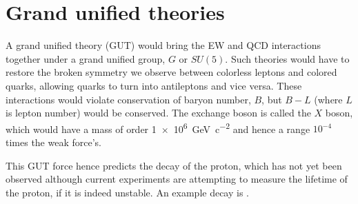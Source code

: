 \section{Grand unified theories}

A grand unified theory (GUT) would bring the EW and QCD interactions together under a grand unified group, $G$ or $SU(5)$. Such theories would have to restore the broken symmetry we observe between colorless leptons and colored quarks, allowing quarks to turn into antileptons and vice versa. These interactions would violate conservation of baryon number, $B$, but $B-L$ (where $L$ is lepton number) would be conserved. The exchange boson is called the $X$ boson, which would have a mass of order \SI[retain-unity-mantissa = false]{1e6}{\giga\electronvolt\per c^2} and hence a range $10^{-4}$ times the weak force's.

This GUT force hence predicts the decay of the proton, which has not yet been observed although current experiments are attempting to measure the lifetime of the proton, if it is indeed unstable. An example decay is \HepProcess{\Pproton \to \Ppositron + \Ppizero}.
